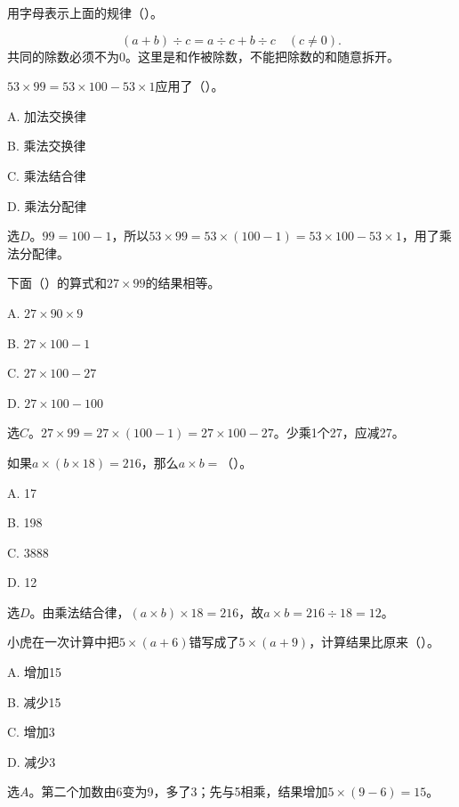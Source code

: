 用字母表示上面的规律（\hspace{1.8em}）。\par
\begin{BookAnswer}
\[(a+b)\div c=a\div c+b\div c\quad(c\ne0).\]共同的除数必须不为0。这里是和作被除数，不能把除数的和随意拆开。
\end{BookAnswer}

\(53\times99=53\times100-53\times1\)应用了（\hspace{1.8em}）。\par
\noindent A. 加法交换律\par
\noindent B. 乘法交换律\par
\noindent C. 乘法结合律\par
\noindent D. 乘法分配律\par
\begin{BookAnswer}
选\(D\)。\(99=100-1\)，所以\(53\times99=53\times(100-1)=53\times100-53\times1\)，用了乘法分配律。
\end{BookAnswer}

下面（\hspace{1.8em}）的算式和\(27\times99\)的结果相等。\par
\noindent A. \(27\times90\times9\)\par
\noindent B. \(27\times100-1\)\par
\noindent C. \(27\times100-27\)\par
\noindent D. \(27\times100-100\)\par
\begin{BookAnswer}
选\(C\)。\(27\times99=27\times(100-1)=27\times100-27\)。少乘1个27，应减27。
\end{BookAnswer}

如果\(a\times(b\times18)=216\)，那么\(a\times b=\)（\hspace{1.8em}）。\par
\noindent A. 17\par
\noindent B. 198\par
\noindent C. 3888\par
\noindent D. 12\par
\begin{BookAnswer}
选\(D\)。由乘法结合律，\allowbreak{}\((a\times b)\times18=216\)，故\(a\times b=216\div18=12\)。
\end{BookAnswer}

小虎在一次计算中把\(5\times(a+6)\)错写成了\(5\times(a+9)\)，计算结果比原来（\hspace{1.8em}）。\par
\noindent A. 增加15\par
\noindent B. 减少15\par
\noindent C. 增加3\par
\noindent D. 减少3\par
\begin{BookAnswer}
选\(A\)。第二个加数由6变为9，多了3；先与5相乘，结果增加\(5\times(9-6)=15\)。
\end{BookAnswer}

